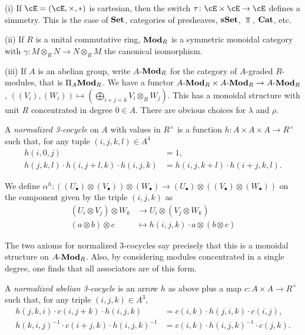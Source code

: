 \documentclass[a4paper,11pt,oneside,openany]{scrbook}
\begin{document}
\begin{exmp}
\item[(i)] If $\cE=(\cE,\times,*)$ is cartesian, then the switch $\tau\colon\cE\times\cE\rightarrow\cE$ defines a simmetry. This is the case of ${\normalfont\textbf{Set}}$, categories of presheaves, ${\normalfont\textbf{sSet}}$, $\Top$, ${\normalfont\textbf{Cat}}$, etc.

\item[(ii)] If $R$ is a unital commutative ring, ${\normalfont\textbf{Mod}}_R$ is a symmetric monoidal category with $\gamma\colon M\otimes_RN\rightarrow N\otimes_RM$ the canonical isomorphism.

\item[(iii)] If $A$ is an abelian group, write $A$-${\normalfont\textbf{Mod}}_R$ for the category of $A$-graded $R$-modules, that is $\Pi_A{\normalfont\textbf{Mod}}_R$. We have a functor $A\text{-}{\normalfont\textbf{Mod}}_R\times A\text{-}{\normalfont\textbf{Mod}}_R\rightarrow A\text{-}{\normalfont\textbf{Mod}}_R$, $((V_i),(W_i))\mapsto (\bigoplus_{i+j=k}V_i\otimes_RW_j)$. This has a monoidal structure with unit $R$ concentrated in degree $0\in A$. There are obvious choices for $\lambda$ and $\rho$.

A \emph{normalized 3-cocycle} on $A$ with values in $R^\times$ is a function $h\colon A\times A\times A\rightarrow R^\times$ such that, for any tuple $(i,j,k,l)\in A^4$
\begin{align*}
    h(i,0,j) &=1, \\
    h(j,k,l)\cdot h(i,j+l,k)\cdot h(i,j,k) &=h(i,j,k+l)\cdot h(i+j,k,l).
\end{align*}

We define $\alpha^h\colon ((U_\bullet)\otimes(V_\bullet))\otimes (W_\bullet)\rightarrow (U_\bullet)\otimes ((V_\bullet)\otimes(W_\bullet))$ on the component given by the triple $(i,j,k)$ as
\begin{align*}
    (U_i\otimes V_j)\otimes W_k &\rightarrow U_i\otimes(V_j\otimes W_k) \\
    (a\otimes b)\otimes c &\mapsto h(i,j,k)\cdot a\otimes (b\otimes c)
\end{align*}

The two axioms for normalized 3-cocycles say precisely that this is a monoidal structure on $A\text{-}{\normalfont\textbf{Mod}}_R$. Also, by considering modules concentrated in a single degree, one finds that all associators are of this form.

A \emph{normalized abelian 3-cocycle} is an arrow $h$ as above plus a map $c\colon A\times A\rightarrow R^\times$ such that, for any triple $(i,j,k)\in A^3$,
\begin{align*}
    h(j,k,i)\cdot c(i,j+k)\cdot h(i,j,k) &=c(i,k)\cdot h(j,i,k)\cdot c(i,j), \\
    h(k,i,j)^{-1}\cdot c(i+j,k)\cdot h(i,j,k)^{-1} &=c(i,k)\cdot h(i,j,k)^{-1}\cdot c(j,k).
\end{align*}


\end{exmp}
\end{document}
